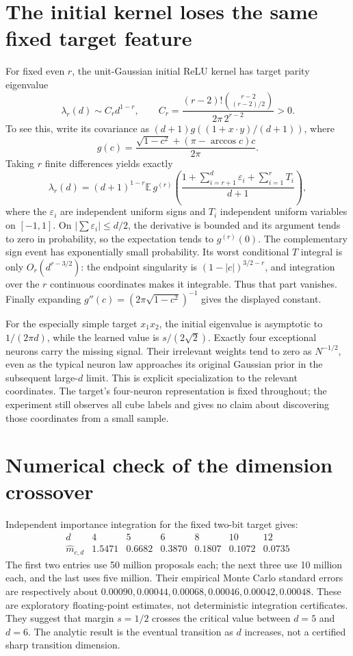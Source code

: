 \documentclass[11pt]{article}
\newcommand{\E}{\mathbb E}\newcommand{\R}{\mathbb R}
\begin{document}
\section{The initial kernel loses the same fixed target feature}
For fixed even $r$, the unit-Gaussian initial ReLU kernel has target
parity eigenvalue
\[
 \lambda_r(d)\sim C_r d^{1-r},\qquad
 C_r=\frac{(r-2)!\binom{r-2}{(r-2)/2}}{2\pi\,2^{r-2}}>0.
\]
To see this, write its covariance as
$(d+1)g((1+x\cdot y)/(d+1))$, where
\[
 g(c)=\frac{\sqrt{1-c^2}+(\pi-\arccos c)c}{2\pi}.
\]
Taking $r$ finite differences yields exactly
\[
 \lambda_r(d)=(d+1)^{1-r}\E\,g^{(r)}
 \left(\frac{1+\sum_{i=r+1}^d\varepsilon_i+
                         \sum_{i=1}^r T_i}{d+1}\right),
\]
where the $\varepsilon_i$ are independent uniform signs and
$T_i$ independent uniform variables on $[-1,1]$.
On $|\sum\varepsilon_i|\le d/2$, the derivative is bounded and its
argument tends to zero in probability, so the expectation tends to
$g^{(r)}(0)$. The complementary sign event has exponentially small
probability. Its worst conditional $T$ integral is only
$O_r(d^{r-3/2})$: the endpoint singularity is
$(1-|c|)^{3/2-r}$, and integration over the $r$ continuous coordinates
makes it integrable. Thus that part vanishes. Finally expanding
$g''(c)=(2\pi\sqrt{1-c^2})^{-1}$ gives the displayed constant.

For the especially simple target $x_1x_2$, the initial eigenvalue is
asymptotic to $1/(2\pi d)$, while the learned value is
$s/(2\sqrt2)$. Exactly four exceptional neurons carry the missing
signal. Their irrelevant weights tend to zero as $N^{-1/2}$, even as
the typical neuron law approaches its original Gaussian prior in the
subsequent large-$d$ limit. This is explicit specialization to the
relevant coordinates. The target's four-neuron representation is fixed
throughout; the experiment still observes all cube labels and gives no
claim about discovering those coordinates from a small sample.
\section{Numerical check of the dimension crossover}
Independent importance integration for the fixed two-bit target gives:
\[
\begin{array}{c|rrrrrr}
 d&4&5&6&8&10&12\\\hline
 \widehat m_{c,d}&1.5471&0.6682&0.3870&0.1807&0.1072&0.0735
\end{array}
\]
The first two entries use 50 million proposals each; the next three use
10 million each, and the last uses five million. Their empirical Monte
Carlo standard errors are respectively about
$0.00090,0.00044,0.00068,0.00046,0.00042,0.00048$.
These are exploratory floating-point estimates, not deterministic
integration certificates. They suggest that margin $s=1/2$ crosses the
critical value between $d=5$ and $d=6$. The analytic result is the eventual
transition as $d$ increases, not a certified sharp transition dimension.
\end{document}
